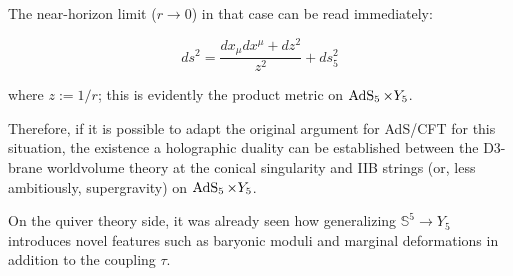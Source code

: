 The near-horizon limit ($r\rightarrow 0$) in that case can be read immediately:

\begin{equation}
ds^2 = \frac{ dx_\mu dx^\mu + dz^2}{z^2} + ds_5^2
\end{equation}

where $z := 1/r$; this is evidently the product metric on $\operatorname{AdS}_{5} \times Y_5$.

Therefore, if it is possible to adapt the original argument for AdS/CFT for this situation, the existence a holographic duality can be established between the D3-brane worldvolume theory at the conical singularity and IIB strings (or, less ambitiously, supergravity) on $\operatorname{AdS}_{5} \times Y_5$.

On the quiver theory side, it was already seen how generalizing $\mathbb{S}^5 \rightarrow Y_5$ introduces novel features such as baryonic moduli and marginal deformations in addition to the coupling $\tau$.

